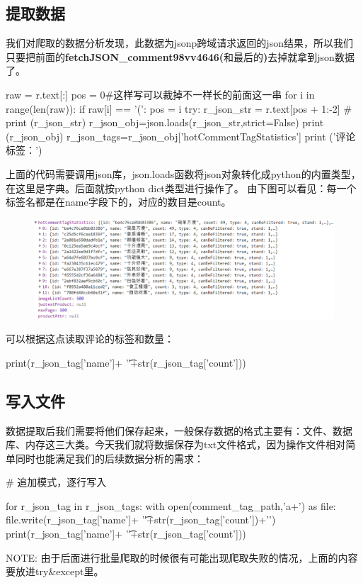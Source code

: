 \subsection{提取数据}
我们对爬取的数据分析发现，此数据为jsonp跨域请求返回的json结果，所以我们只要把前面的\textbf{fetchJSON_comment98vv4646(}和最后的\textbf{)}去掉就拿到json数据了。

\begin{python}
raw = r.text[:]
pos = 0#这样写可以裁掉不一样长的前面这一串
for i in range(len(raw)):
    if raw[i] == '(':
        pos = i
try:
    r_json_str = r.text[pos + 1:-2]
    # print (r_json_str)
    r_json_obj=json.loads(r_json_str,strict=False)
    print (r_json_obj)
    r_json_tags=r_json_obj['hotCommentTagStatistics']
    print ('评论标签：')
\end{python}
上面的代码需要调用json库，json.loads函数将json对象转化成python的内置类型，在这里是字典。后面就按python dict类型进行操作了。
由下图可以看见：每一个标签名都是在name字段下的，对应的数目是count。
\begin{figure}[htbp]
\centering
\includegraphics[width=13.5cm]{cmt tags eg jd.png}
\end{figure}
可以根据这点读取评论的标签和数量：
\begin{python}
print(r_json_tag['name']+
                      '\t'+str(r_json_tag['count']))
\end{python}
\subsection{写入文件}
数据提取后我们需要将他们保存起来，一般保存数据的格式主要有：文件、数据库、内存这三大类。今天我们就将数据保存为txt文件格式，因为操作文件相对简单同时也能满足我们的后续数据分析的需求：
\begin{python}
# 追加模式，逐行写入

        for r_json_tag in r_json_tags:
            with open(comment_tag_path,'a+') as file:
                file.write(r_json_tag['name']+
                           '\t'+str(r_json_tag['count'])+'\n')
                print(r_json_tag['name']+
                      '\t'+str(r_json_tag['count']))
\end{python}
NOTE: 由于后面进行批量爬取的时候很有可能出现爬取失败的情况，上面的内容要放进try\&except里。

